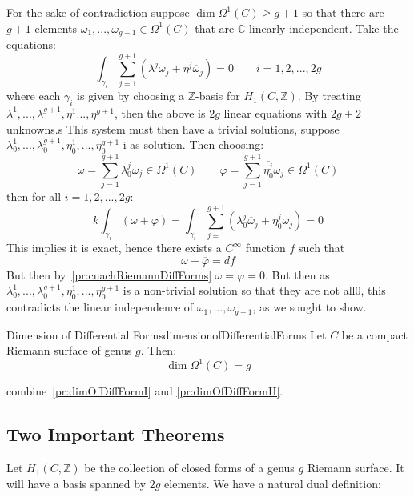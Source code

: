 \documentclass{book}
\newcommand{\C}{{\mathbb{C}}}
\newcommand{\Z}{{\mathbb{Z}}}
\let\temp\phi
\let\phi\varphi
\let\varphi\temp
\begin{document}
\begin{Proof}
  For the sake of contradiction suppose $\dim \Omega^1(C) \ge g+1$ so that there are $g+1$ elements
  $\omega_1, ..., \omega_{g+1} \in \Omega^1(C)$ that are $\C$-linearly independent. Take the equations:
  \[
    \int_{\gamma_i} \sum_{j=1}^{g+1} (\lambda^j\omega_j + \eta^j \overline{\omega}_j) = 0 \qquad
    i=1,2,..., 2g
  \]
  where each $\gamma_i$ is given by choosing a $\Z$-basis for $H_1(C, \Z)$. By  treating
  $\lambda^1, ..., \lambda^{g+1}, \eta^1 ..., \eta^{g+1}$, then the above is $2g$ linear equations with
  $2g+2$ unknowns.s This system must then have a trivial solutions, suppose $\lambda_0^1, ...,
  \lambda_0^{g+1}, \eta_0^1, ..., \eta_0^{g+1}$ i as solution. Then choosing:
  \[
    \omega = \sum_{j=1}^{g+1} \lambda_0^j\omega_j \in \Omega^1(C) \qquad \phi = \sum_{j=1}^{g+1}
    \overline{\eta_0^j}\omega_j \in \Omega^1(C)
  \]
  then for all $i = 1,2,..., 2g$:
  \[
    k\int_{\gamma_i} (\omega  +\overline{\phi}) = \int_{\gamma_i} \sum_{j=1}^{g+1}
    (\lambda_0^j \overline{\omega}_j + \eta_0^j \omega_j) = 0
  \]
  This implies it is exact, hence there exists a $C^\infty$ function $f$ such that
  \[
    \omega + \overline{\phi} = df
  \]
  But then by~\cref{pr:cuachRiemannDiffForms} $\omega = \phi = 0$. But then as $\lambda_0^1, ...,
  \lambda_0^{g+1}, \eta_0^1, ..., \eta_0^{g+1}$ is a non-trivial solution so that they are not all$0$,
  this contradicts the linear independence of $\omega_1, ..., \omega_{g+1}$, as we sought to
  show.
\end{Proof}

\begin{thm}{Dimension of Differential Forms}{dimensionofDifferentialForms}
  Let $C$ be a compact Riemann surface of genus $g$. Then:
  \[
    \dim \Omega^1(C) = g
  \]
\end{thm}

\begin{Proof}
  combine~\cref{pr:dimOfDiffFormI} and \cref{pr:dimOfDiffFormII}.
\end{Proof}


\subsection{Two Important Theorems}

Let $H_1(C, \Z)$ be the collection of closed forms of a genus $g$ Riemann surface. It will have a basis
spanned by $2g$ elements. We have a natural dual definition:
\end{document}
